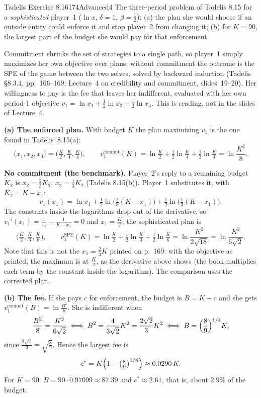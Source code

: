 \begin{exsol}{Tadelis Exercise 8.16}{174}{Advanced}{4}
\asked The three-period problem of Tadelis 8.15 for a \emph{sophisticated} player~1 ($\ln x$, $\delta = 1$,
$\beta = \frac12$): (a) the plan she would choose if an outside entity could enforce it and stop player~2
from changing it; (b) for $K = 90$, the largest part of the budget she would pay for that enforcement.

\method Commitment shrinks the set of strategies to a single path, so player~1 simply maximizes her own
objective over plans; without commitment the outcome is the SPE of the game between the two selves, solved by
backward induction (Tadelis \S8.3.4, pp.~166--169; Lecture~4 on credibility and commitment, slides~19--20). Her willingness
to pay is the fee that leaves her indifferent, evaluated with her own period-1 objective
$v_1 = \ln x_1 + \frac12\ln x_2 + \frac12\ln x_3$. This is reading, not in the slides of Lecture~4.

\solution
\textbf{(a) The enforced plan.} With budget $K$ the plan maximizing $v_1$ is the one found in Tadelis~8.15(a):
\[
  \bigl(x_1, x_2, x_3\bigr) = \bigl(\tfrac K2, \tfrac K4, \tfrac K4\bigr),
  \qquad v_1^{\text{commit}}(K) = \ln\tfrac K2 + \tfrac12\ln\tfrac K4 + \tfrac12\ln\tfrac K4
  = \ln\frac{K^2}{8}.
\]

\textbf{No commitment (the benchmark).} Player~2's reply to a remaining budget $K_2$ is
$x_2 = \frac23K_2$, $x_3 = \frac13K_2$ (Tadelis 8.15(b)). Player~1 substitutes it, with $K_2 = K - x_1$:
\[
  v_1(x_1) = \ln x_1 + \tfrac12\ln\bigl(\tfrac23(K - x_1)\bigr) + \tfrac12\ln\bigl(\tfrac13(K - x_1)\bigr).
\]
The constants inside the logarithms drop out of the derivative, so
$v_1'(x_1) = \frac{1}{x_1} - \frac{1}{K - x_1} = 0$ and $x_1 = \frac K2$; the sophisticated plan is
\[
  \bigl(\tfrac K2, \tfrac K3, \tfrac K6\bigr), \qquad
  v_1^{\text{SPE}}(K) = \ln\tfrac K2 + \tfrac12\ln\tfrac K3 + \tfrac12\ln\tfrac K6
  = \ln\frac{K^2}{2\sqrt{18}} = \ln\frac{K^2}{6\sqrt2}.
\]
Note that this is not the $x_1 = \frac23K$ printed on p.~169: with the objective as printed, the maximum is at
$\frac K2$, as the derivative above shows (the book multiplies each term by the constant inside the logarithm).
The comparison uses the corrected plan.

\textbf{(b) The fee.} If she pays $c$ for enforcement, the budget is $B = K - c$ and she gets
$v_1^{\text{commit}}(B) = \ln\frac{B^2}{8}$. She is indifferent when
\[
  \frac{B^2}{8} = \frac{K^2}{6\sqrt2}
  \iff B^2 = \frac{4}{3\sqrt2}K^2 = \frac{2\sqrt2}{3}K^2
  \iff B = \Bigl(\frac89\Bigr)^{1/4}K ,
\]
since $\frac{2\sqrt2}{3} = \sqrt{\frac89}$. Hence the largest fee is
\[
  c^* = K\Bigl(1 - \bigl(\tfrac89\bigr)^{1/4}\Bigr) \approx 0.0290\,K .
\]
For $K = 90$: $B = 90\cdot 0.97099 \approx 87.39$ and $c^* \approx 2.61$, that is, about $2.9\%$ of the budget.


\end{exsol}
